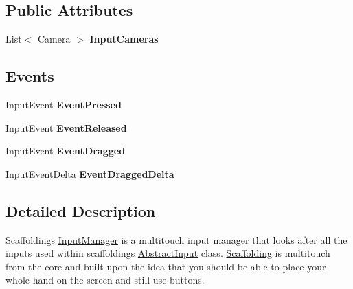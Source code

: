 \subsection*{Public Attributes}
\begin{DoxyCompactItemize}
\item 
\hypertarget{class_scaffolding_1_1_input_manager_a57bb2fd00222e3748fe3d8d06c7df0ec}{List$<$ Camera $>$ {\bfseries Input\+Cameras}}\label{class_scaffolding_1_1_input_manager_a57bb2fd00222e3748fe3d8d06c7df0ec}

\end{DoxyCompactItemize}
\subsection*{Events}
\begin{DoxyCompactItemize}
\item 
\hypertarget{class_scaffolding_1_1_input_manager_a0cd2afadd2f9bf461269497b0ba988ef}{Input\+Event {\bfseries Event\+Pressed}}\label{class_scaffolding_1_1_input_manager_a0cd2afadd2f9bf461269497b0ba988ef}

\item 
\hypertarget{class_scaffolding_1_1_input_manager_a2ea3e35f371d9777d16174216a156ba9}{Input\+Event {\bfseries Event\+Released}}\label{class_scaffolding_1_1_input_manager_a2ea3e35f371d9777d16174216a156ba9}

\item 
\hypertarget{class_scaffolding_1_1_input_manager_af97450c838114a179c136de954764955}{Input\+Event {\bfseries Event\+Dragged}}\label{class_scaffolding_1_1_input_manager_af97450c838114a179c136de954764955}

\item 
\hypertarget{class_scaffolding_1_1_input_manager_a9317d8d6bb537c1614c925390c1442a5}{Input\+Event\+Delta {\bfseries Event\+Dragged\+Delta}}\label{class_scaffolding_1_1_input_manager_a9317d8d6bb537c1614c925390c1442a5}

\end{DoxyCompactItemize}


\subsection{Detailed Description}
Scaffoldings \hyperlink{class_scaffolding_1_1_input_manager}{Input\+Manager} is a multitouch input manager that looks after all the inputs used within scaffoldings \hyperlink{class_scaffolding_1_1_abstract_input}{Abstract\+Input} class. \hyperlink{namespace_scaffolding}{Scaffolding} is multitouch from the core and built upon the idea that you should be able to place your whole hand on the screen and still use buttons. 



